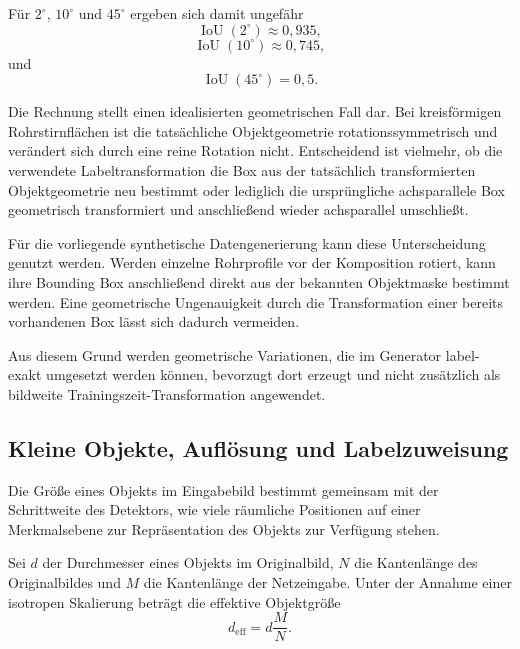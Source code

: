 Für $2^\circ$, $10^\circ$ und $45^\circ$ ergeben sich damit ungefähr
\begin{equation}
\operatorname{IoU}(2^\circ)\approx0{,}935,
\end{equation}
\begin{equation}
\operatorname{IoU}(10^\circ)\approx0{,}745,
\end{equation}
und
\begin{equation}
\operatorname{IoU}(45^\circ)=0{,}5.
\end{equation}

Die Rechnung stellt einen idealisierten geometrischen Fall dar. Bei kreisförmigen Rohrstirnflächen ist die tatsächliche Objektgeometrie rotationssymmetrisch und verändert sich durch eine reine Rotation nicht. Entscheidend ist vielmehr, ob die verwendete Labeltransformation die Box aus der tatsächlich transformierten Objektgeometrie neu bestimmt oder lediglich die ursprüngliche achsparallele Box geometrisch transformiert und anschließend wieder achsparallel umschließt.

Für die vorliegende synthetische Datengenerierung kann diese Unterscheidung genutzt werden. Werden einzelne Rohrprofile vor der Komposition rotiert, kann ihre Bounding Box anschließend direkt aus der bekannten Objektmaske bestimmt werden. Eine geometrische Ungenauigkeit durch die Transformation einer bereits vorhandenen Box lässt sich dadurch vermeiden.

Aus diesem Grund werden geometrische Variationen, die im Generator label-exakt umgesetzt werden können, bevorzugt dort erzeugt und nicht zusätzlich als bildweite Trainingszeit-Transformation angewendet.

\subsection{Kleine Objekte, Auflösung und Labelzuweisung}

Die Größe eines Objekts im Eingabebild bestimmt gemeinsam mit der Schrittweite des Detektors, wie viele räumliche Positionen auf einer Merkmalsebene zur Repräsentation des Objekts zur Verfügung stehen.

Sei $d$ der Durchmesser eines Objekts im Originalbild, $N$ die Kantenlänge des Originalbildes und $M$ die Kantenlänge der Netzeingabe. Unter der Annahme einer isotropen Skalierung beträgt die effektive Objektgröße
\begin{equation}
d_{\mathrm{eff}}
=
d\frac{M}{N}.
\tag{3.8}
\end{equation}

